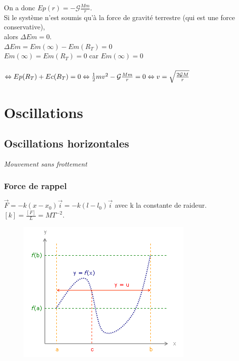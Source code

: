 \documentclass[a4paper,10pt]{book}
\begin{document}
On a donc $Ep(r)=-\mathcal{G}\frac{Mm}{r}$.\\

Si le système n'est soumis qu'à la force de gravité terrestre (qui est une force conservative),\\
alors $\Delta Em=0$.\\

$\Delta Em=Em(\infty)-Em(R_{T})=0$\\

$Em(\infty)=Em(R_{T})=0$ car $Em(\infty)=0$ \\\\
$\Leftrightarrow Ep(R_{T})+Ec(R_{T})=0 \\\\
\Leftrightarrow \frac{1}{2}mv^{2}-\mathcal{G}\frac{Mm}{r}=0 \\\\
\Leftrightarrow v=\sqrt{\frac{2\mathcal{G}M}{r}}\\ $

\chapter{Oscillations}
\section{Oscillations horizontales}
\textit{Mouvement sans frottement}
\subsection{Force de rappel}
$\vec{F}=-k(x-x_{0})\vec{i}=-k(l-l_{0})\vec{i}$ avec k la constante de raideur. $[k]=\frac{[F]}{L}=MT^{-2}$.
\begin{figure}
\includegraphics[scale=0.3]{images/025.png}
\end{figure} 
\end{document}
